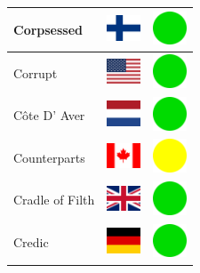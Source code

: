 \documentclass[12pt, a4paper, twoside]{report}
\begin{document}
\begin{center}
\begin{longtable}{|p{5cm}|p{2cm}|p{2cm}|}
Corpsessed & \includegraphics[width=1cm]{4x3/fi} & \includegraphics[width=1cm]{likes/y} \\ \hline
Corrupt & \includegraphics[width=1cm]{4x3/us} & \includegraphics[width=1cm]{likes/y} \\ \hline
Côte D' Aver & \includegraphics[width=1cm]{4x3/nl} & \includegraphics[width=1cm]{likes/y} \\ \hline
Counterparts & \includegraphics[width=1cm]{4x3/ca} & \includegraphics[width=1cm]{likes/m} \\ \hline
Cradle of Filth & \includegraphics[width=1cm]{4x3/gb} & \includegraphics[width=1cm]{likes/y} \\ \hline
Credic & \includegraphics[width=1cm]{4x3/de} & \includegraphics[width=1cm]{likes/y} \\ \hline

\end{longtable}
\end{center}
\end{document}
